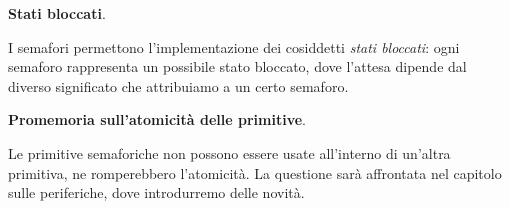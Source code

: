 \begin{framed}
	\noindent \textbf{Stati bloccati}.
	
	\noindent I semafori permettono l'implementazione dei cosiddetti \emph{stati bloccati}: ogni semaforo rappresenta un possibile stato bloccato, dove l'attesa dipende dal diverso significato che attribuiamo a un certo semaforo.
\end{framed} 

\begin{framed}
	\noindent \textbf{Promemoria sull'atomicità delle primitive}.
	
	\noindent Le primitive semaforiche non possono essere usate all'interno di un'altra primitiva, ne romperebbero l'atomicità. La questione sarà affrontata nel capitolo sulle periferiche, dove introdurremo delle novità.
\end{framed} 